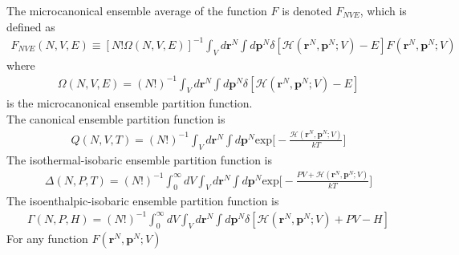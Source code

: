 \documentclass{article}
\begin{document}
The microcanonical ensemble average of the function $F$ is denoted $F_{NVE}$, which is defined as
\begin{align}
F_{NVE}(N,V,E)\equiv [N!\Omega(N,V,E)]^{-1}\int_Vd\textbf{r}^N\int d\textbf{p}^N\delta[\mathscr{H}(\textbf{r}^N,\textbf{p}^N;V)-E]F(\textbf{r}^N,\textbf{p}^N;V)
\end{align}
where 
\begin{align}
\Omega(N,V,E)=(N!)^{-1}\int_Vd\textbf{r}^N\int d\textbf{p}^N\delta[\mathscr{H}(\textbf{r}^N,\textbf{p}^N;V)-E]
\end{align}
is the microcanonical ensemble partition function.\\
The canonical ensemble partition function is
\begin{align}
Q(N,V,T)=(N!)^{-1}\int_Vd\textbf{r}^N\int d\textbf{p}^N \text{exp}\big[-\frac{\mathscr{H}(\textbf{r}^N,\textbf{p}^N;V)}{kT}\big]
\end{align}
The isothermal-isobaric ensemble partition function is
\begin{align}
\Delta(N,P,T)=(N!)^{-1}\int^{\infty}_0dV\int_Vd\textbf{r}^N\int d\textbf{p}^N \text{exp}\big[-\frac{PV+\mathscr{H}(\textbf{r}^N,\textbf{p}^N;V)}{kT}\big]
\end{align}
The isoenthalpic-isobaric ensemble partition function is
\begin{align}
\Gamma(N,P,H)=(N!)^{-1}\int^{\infty}_0 dV\int_Vd\textbf{r}^N\int d\textbf{p}^N\delta[\mathscr{H}(\textbf{r}^N,\textbf{p}^N;V)+PV-H]
\end{align}
For any function $F(\textbf{r}^N,\textbf{p}^N;V)$
\end{document}
